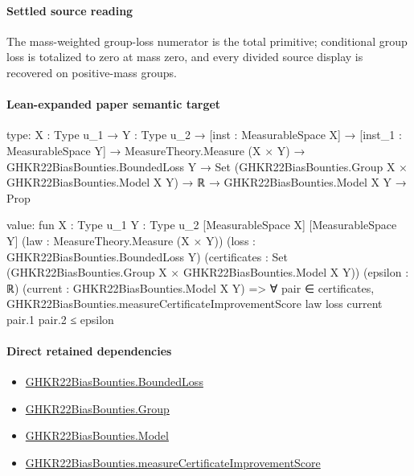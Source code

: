 \documentclass[10pt]{article}
\begin{document}
\paragraph{Settled source reading}
The mass-\allowbreak{}weighted group-\allowbreak{}loss numerator is the total primitive;\allowbreak{} conditional group loss is totalized to zero at mass zero, and every divided source display is recovered on positive-\allowbreak{}mass groups.\allowbreak{}

\paragraph{Lean-expanded paper semantic target}
\begin{ReviewVerbatim}
type:
{X : Type u_1} →
  {Y : Type u_2} →
    [inst : MeasurableSpace X] →
      [inst_1 : MeasurableSpace Y] →
        MeasureTheory.Measure (X × Y) →
          GHKR22BiasBounties.BoundedLoss Y →
            Set (GHKR22BiasBounties.Group X × GHKR22BiasBounties.Model X Y) → ℝ → GHKR22BiasBounties.Model X Y → Prop

value:
fun {X : Type u_1} {Y : Type u_2} [MeasurableSpace X] [MeasurableSpace Y] (law : MeasureTheory.Measure (X × Y))
    (loss : GHKR22BiasBounties.BoundedLoss Y)
    (certificates : Set (GHKR22BiasBounties.Group X × GHKR22BiasBounties.Model X Y)) (epsilon : ℝ)
    (current : GHKR22BiasBounties.Model X Y) =>
  ∀ pair ∈ certificates, GHKR22BiasBounties.measureCertificateImprovementScore law loss current pair.1 pair.2 ≤ epsilon
\end{ReviewVerbatim}

\paragraph{Direct retained dependencies}
\begin{itemize}\raggedright
\item \hyperlink{paper-prerequisite-ef6c319b0770dad4}{GHKR22\allowbreak{}Bias\allowbreak{}Bounties.\allowbreak{}Bounded\allowbreak{}Loss}
\item \hyperlink{paper-prerequisite-cc7214115b27106f}{GHKR22\allowbreak{}Bias\allowbreak{}Bounties.\allowbreak{}Group}
\item \hyperlink{paper-prerequisite-333127605c12eba8}{GHKR22\allowbreak{}Bias\allowbreak{}Bounties.\allowbreak{}Model}
\item \hyperlink{governing-declaration-2e0e5d7f62565d9c}{GHKR22\allowbreak{}Bias\allowbreak{}Bounties.\allowbreak{}measure\allowbreak{}Certificate\allowbreak{}Improvement\allowbreak{}Score}
\end{itemize}
\end{document}
